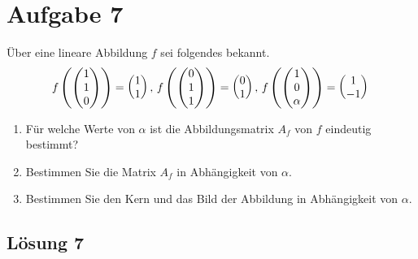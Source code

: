 \documentclass[main.tex]{subfiles}
\begin{document}
\arraycolsep=1pt
\section{Aufgabe 7}
Über eine lineare Abbildung $f$ sei folgendes bekannt.
$$
    f\left(\begin{pmatrix}
        1 \\ 1 \\ 0
    \end{pmatrix}\right) = \begin{pmatrix}
        1 \\ 1
    \end{pmatrix},\,
    f\left(\begin{pmatrix}
        0 \\ 1 \\ 1
    \end{pmatrix}\right) = \begin{pmatrix}
        0 \\ 1
    \end{pmatrix},\,
    f\left(\begin{pmatrix}
        1 \\ 0 \\ \alpha
    \end{pmatrix}\right) = \begin{pmatrix}
        1 \\ -1
    \end{pmatrix}\\
    $$

\begin{enumerate}
    \item Für welche Werte von $\alpha$ ist die Abbildungsmatrix $A_f$ von $f$ eindeutig bestimmt?
    \item Bestimmen Sie die Matrix $A_f$ in Abhängigkeit von $\alpha$.
    \item Bestimmen Sie den Kern und das Bild der Abbildung in Abhängigkeit von $\alpha$.
\end{enumerate}

\subsection{Lösung 7}
\end{document}
